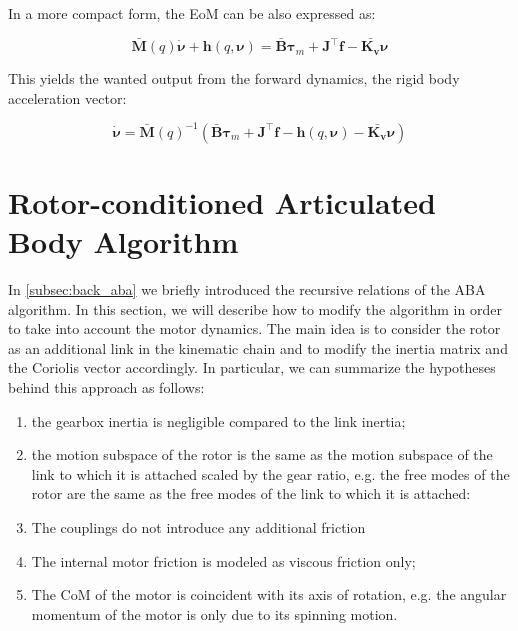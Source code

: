 In a more compact form, the \ac{EoM} can be also expressed as:

\begin{equation}
    \mathbf{\bar{M}}(q)\dot{\boldsymbol{\nu}} + \mathbf{h}(q,\boldsymbol{\nu}) = \mathbf{\bar{B}}\boldsymbol{\tau} _m + \mathbf{J} ^\top \mathbf{f} - \bar{\mathbf{K _v}}\boldsymbol{\nu}
\end{equation}

This yields the wanted output from the forward dynamics, the rigid body acceleration vector:

\begin{equation}
    \dot{\boldsymbol{\nu}} = \mathbf{\bar{M}}(q) ^{-1} (\mathbf{\bar{B}}\boldsymbol{\tau} _m + \mathbf{J} ^\top \mathbf{f} - \mathbf{h}(q,\boldsymbol{\nu}) - \bar{\mathbf{K _v}}\boldsymbol{\nu})
\end{equation}

\section{Rotor-conditioned Articulated Body Algorithm}

In \cref{subsec:back_aba} we briefly introduced the recursive relations of the \ac{ABA} algorithm. In this section, we will describe how to modify the algorithm in order to take into account the motor dynamics. The main idea is to consider the rotor as an additional link in the kinematic chain and to modify the inertia matrix and the Coriolis vector accordingly. In particular, we can summarize the hypotheses behind this approach as follows:

\begin{enumerate}
    \item the gearbox inertia is negligible compared to the link inertia;
    \item the motion subspace of the rotor is the same as the motion subspace of the link to which it is attached scaled by the gear ratio, e.g. the free modes of the rotor are the same as the free modes of the link to which it is attached:
    \item The couplings do not introduce any additional friction
    \item The internal motor friction is modeled as viscous friction only;
    \item The \ac{CoM} of the motor is coincident with its axis of rotation, e.g. the angular momentum of the motor is only due to its spinning motion.
\end{enumerate}

